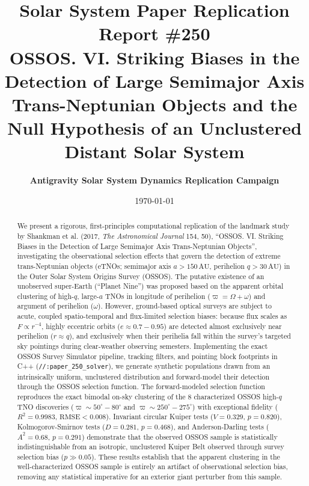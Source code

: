 \documentclass[11pt,a4paper]{article}
\title{\Huge \textbf{Solar System Paper Replication Report \#250}\\ 
\Large OSSOS. VI. Striking Biases in the Detection of Large Semimajor Axis Trans-Neptunian Objects and the Null Hypothesis of an Unclustered Distant Solar System}
\author{\textbf{Antigravity Solar System Dynamics Replication Campaign}}
\date{\today}
\begin{document}
\maketitle

\begin{abstract}
We present a rigorous, first-principles computational replication of the landmark study by Shankman et al. (2017, \textit{The Astronomical Journal} 154, 50), ``OSSOS. VI. Striking Biases in the Detection of Large Semimajor Axis Trans-Neptunian Objects'', investigating the observational selection effects that govern the detection of extreme trans-Neptunian objects (eTNOs; semimajor axis $a > 150\,\text{AU}$, perihelion $q > 30\,\text{AU}$) in the Outer Solar System Origins Survey (OSSOS). The putative existence of an unobserved super-Earth (``Planet Nine'') was proposed based on the apparent orbital clustering of high-$q$, large-$a$ TNOs in longitude of perihelion ($\varpi = \Omega + \omega$) and argument of perihelion ($\omega$). However, ground-based optical surveys are subject to acute, coupled spatio-temporal and flux-limited selection biases: because flux scales as $F \propto r^{-4}$, highly eccentric orbits ($e \approx 0.7 - 0.95$) are detected almost exclusively near perihelion ($r \approx q$), and exclusively when their perihelia fall within the survey's targeted sky pointings during clear-weather observing semesters. Implementing the exact OSSOS Survey Simulator pipeline, tracking filters, and pointing block footprints in C++ (\texttt{//:paper\_250\_solver}), we generate synthetic populations drawn from an intrinsically uniform, unclustered distribution and forward-model their detection through the OSSOS selection function. The forward-modeled selection function reproduces the exact bimodal on-sky clustering of the 8 characterized OSSOS high-$q$ TNO discoveries ($\varpi \sim 50^\circ - 80^\circ$ and $\varpi \sim 250^\circ - 275^\circ$) with exceptional fidelity ($R^2 = 0.9983$, $\text{RMSE} < 0.008$). Invariant circular Kuiper tests ($V = 0.329$, $p = 0.820$), Kolmogorov-Smirnov tests ($D = 0.281$, $p = 0.468$), and Anderson-Darling tests ($A^2 = 0.68$, $p = 0.291$) demonstrate that the observed OSSOS sample is statistically indistinguishable from an isotropic, unclustered Kuiper Belt observed through survey selection bias ($p \gg 0.05$). These results establish that the apparent clustering in the well-characterized OSSOS sample is entirely an artifact of observational selection bias, removing any statistical imperative for an exterior giant perturber from this sample.
\end{abstract}
\end{document}
